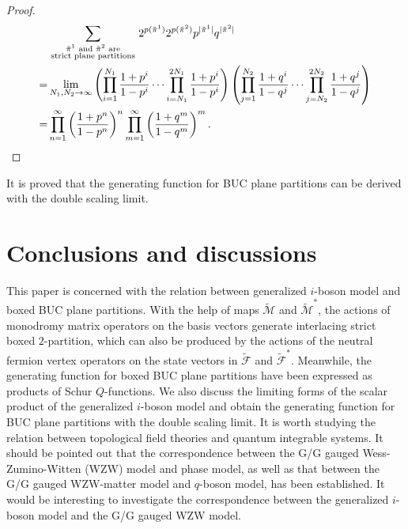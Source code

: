 \documentclass[11pt,reqno]{amsart}
\numberwithin{equation}{section}
\begin{document}
\begin{proof}
\begin{align}
			&\sum_{\begin{smallmatrix}\tilde{\pi}^{1}\text{ and }\tilde{\pi}^{2}\text{ are}\\\text{strict plane partitions}\end{smallmatrix}}
			2^{p{(\tilde{\pi}^{1})}}2^{p{(\tilde{\pi}^{2})}}
			p^{|\tilde{\pi}^{1}|}q^{|\tilde{\pi}^{2}|}  \notag\\
			=&\lim\limits_{N_{1},N_{2}\to \infty}	
			\left(\prod_{i=1}^{N_1} \frac{1 + p^{i}}{1 - p^{i}}  \cdots  \prod_{i=N_1}^{2N_1} \frac{1 + p^{i}}{1 - p^{i}}\right)
			\left(\prod_{j=1}^{N_2} \frac{1 + q^{i}}{1 - q^{j}}  \cdots  \prod_{j=N_2}^{2N_2} \frac{1 + q^{j}}{1 - q^{j}}\right)\notag\\
			=&\prod_{n=1}^\infty\left(\frac{1+p^n}{1-p^n}\right)^n
			\prod_{m=1}^\infty\left(\frac{1+q^m}{1-q^m}\right)^m.
		\end{align}
	\end{proof}
It is proved that the generating function for BUC plane partitions can be derived  with the double scaling limit.
	
	
	
	\section{Conclusions and discussions}
	This paper is concerned with the  relation between  generalized $i$-boson model and boxed BUC plane partitions.
	With the help of maps $\tilde{\mathcal{M}}$ and $\tilde{\mathcal{M}}^*$,
 the actions of  monodromy matrix operators on the basis vectors generate interlacing  strict boxed   $2$-partition, which  can also be produced by the actions of the neutral fermion vertex operators on the state vectors in $\mathcal{\widetilde{F}}$ and  $\mathcal{\widetilde{F}}^{*}$.
	Meanwhile, the generating function for boxed BUC plane partitions have been  expressed as products of Schur $Q$-functions.
	We also discuss the limiting forms of the scalar product of the   generalized $i$-boson model and obtain the  generating function for  BUC plane partitions with the double scaling limit.
	It is worth studying  the relation	between topological field theories and quantum integrable systems.
	It should be pointed out that the  correspondence
	between the G/G gauged Wess-Zumino-Witten (WZW) model and phase model, as well as that between the G/G gauged WZW-matter model
	and  $q$-boson model, has been established\cite{G/G-phase-model,G/G-q-boson-model}.
	It would be interesting to investigate the correspondence between
	the   generalized $i$-boson model and  the G/G gauged WZW model.
	
\end{document}
